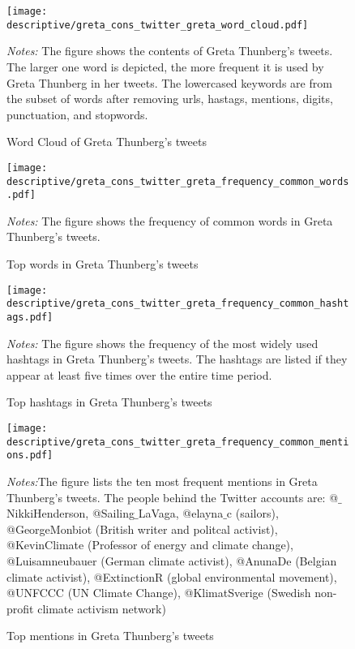 \documentclass[11pt, a4paper]{article} %
\begin{document}
\newpage
\begin{figure}[H]\centering
	\caption{Word Cloud of Greta Thunberg's tweets}
	\texttt{[image: descriptive/greta\_cons\_twitter\_greta\_word\_cloud.pdf]}
	\begin{minipage}{\linewidth}
		\scriptsize{\emph{Notes:} The figure shows the contents of Greta Thunberg's tweets. The larger one word is depicted, the more frequent it is used by Greta Thunberg in her tweets. The lowercased keywords are from the subset of words after removing urls, hastags, mentions, digits, punctuation, and stopwords.}
	\end{minipage}
\end{figure}

\begin{figure}[H]\centering
	\caption{Top words in Greta Thunberg's tweets}
	\texttt{[image: descriptive/greta\_cons\_twitter\_greta\_frequency\_common\_words.pdf]}
	\begin{minipage}{\linewidth}
		\scriptsize{\emph{Notes:} The figure shows the frequency of common words in Greta Thunberg's tweets.}
	\end{minipage}
\end{figure}


\begin{figure}[H]\centering
	\caption{Top hashtags in Greta Thunberg's tweets}
	\texttt{[image: descriptive/greta\_cons\_twitter\_greta\_frequency\_common\_hashtags.pdf]}
	\begin{minipage}{\linewidth}
		\scriptsize{\emph{Notes:} The figure shows the frequency of the most widely used hashtags in Greta Thunberg's tweets. The hashtags are listed if they appear at least five times over the entire time period. }
	\end{minipage}
\end{figure}


\begin{figure}[H]\centering
	\caption{Top mentions in Greta Thunberg's tweets}
	\texttt{[image: descriptive/greta\_cons\_twitter\_greta\_frequency\_common\_mentions.pdf]}
	\begin{minipage}{\linewidth}
		\scriptsize{\emph{Notes:}The figure lists the ten most frequent mentions in Greta Thunberg's tweets. The people behind the Twitter accounts are: @$\_$NikkiHenderson, @Sailing$\_$LaVaga, @elayna$\_$c (sailors), @GeorgeMonbiot (British writer and politcal activist),  @KevinClimate (Professor of energy and climate change), @Luisamneubauer (German climate activist), @AnunaDe (Belgian climate activist), @ExtinctionR (global environmental movement), @UNFCCC (UN Climate Change), @KlimatSverige (Swedish non-profit climate activism network)}
	\end{minipage}
\end{figure}
\end{document}
